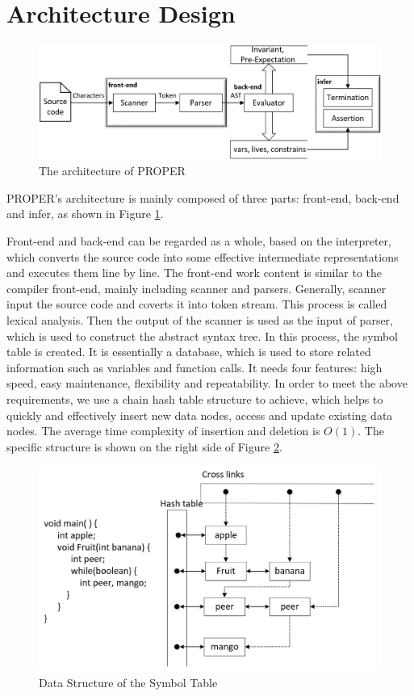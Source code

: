 \documentclass[runningheads]{llncs}
\begin{document}
\section{Architecture Design }
\begin{figure}[h]
	\centering
	\label{architecture}
	\includegraphics[scale=0.6]{img/architecture}
	\caption{The architecture of PROPER}
\end{figure}
PROPER's architecture is mainly composed of three parts: front-end, back-end and infer, as shown in Figure \ref{architecture}.  

Front-end and back-end can be regarded as a whole, based on the interpreter, which converts the source code into some effective intermediate representations and executes them line by line. The front-end work content is similar to the compiler front-end, mainly including scanner and parsers. Generally, scanner input the source code and coverts it into token stream. This process is called lexical analysis. Then the output of the scanner is used as the input of parser, which is used to construct the abstract syntax tree.
In this process, the symbol table is created. It is essentially a database, which is used to store related information such as variables and function calls. It needs four features: high speed, easy maintenance, flexibility and repeatability. In order to meet the above requirements, we use a chain hash table structure to achieve, which helps to quickly and effectively insert new data nodes, access and update existing data nodes. The average time complexity of insertion and deletion is $O(1)$. The specific structure is shown on the right side of Figure \ref{symbolTable}.
\begin{figure}[h]
	\centering
	\includegraphics[scale=0.6]{img/symbolTable}
	\caption{Data Structure of the Symbol Table}
	\label{symbolTable}
\end{figure}
\end{document}
